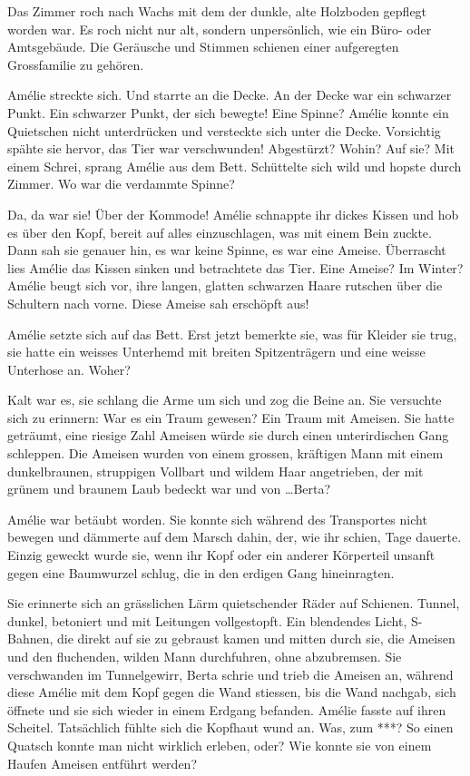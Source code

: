 \documentclass[11pt,titlepage,a5paper]{book}
\begin{document}
Das Zimmer roch nach Wachs mit dem der dunkle, alte Holzboden gepflegt worden war. Es roch nicht nur alt, sondern unpersönlich, wie ein Büro- oder Amtsgebäude. Die Geräusche und Stimmen schienen einer aufgeregten Grossfamilie zu gehören.

Amélie streckte sich. Und starrte an die Decke. An der Decke war ein schwarzer Punkt. Ein schwarzer Punkt, der sich bewegte! Eine Spinne? Amélie konnte ein Quietschen nicht unterdrücken und versteckte sich unter die Decke. Vorsichtig spähte sie hervor, das Tier war verschwunden! Abgestürzt? Wohin? Auf sie? Mit einem Schrei, sprang Amélie aus dem Bett. Schüttelte sich wild und hopste durch Zimmer. Wo war die verdammte Spinne?

 Da, da war sie! Über der Kommode! Amélie schnappte ihr dickes Kissen und hob es über den Kopf, bereit auf alles einzuschlagen, was mit einem Bein zuckte. Dann sah sie genauer hin, es war keine Spinne, es war eine Ameise. Überrascht lies Amélie das Kissen sinken und betrachtete das Tier. Eine Ameise? Im Winter? Amélie beugt sich vor, ihre langen, glatten schwarzen Haare rutschen über die Schultern nach vorne. Diese Ameise sah erschöpft aus!

Amélie setzte sich auf das Bett. Erst jetzt bemerkte sie, was für Kleider sie trug, sie hatte ein weisses Unterhemd mit breiten Spitzenträgern und eine weisse Unterhose an. Woher? 

Kalt war es, sie schlang die Arme um sich und zog die Beine an. Sie versuchte sich zu erinnern: War es ein Traum gewesen? Ein Traum mit Ameisen. Sie hatte geträumt, eine riesige Zahl Ameisen würde sie durch einen unterirdischen Gang schleppen. Die Ameisen wurden von einem grossen, kräftigen Mann mit einem dunkelbraunen, struppigen Vollbart und wildem Haar angetrieben, der mit grünem und braunem Laub bedeckt war und von \dots Berta?

 Amélie war betäubt worden. Sie konnte sich während des Transportes nicht bewegen und dämmerte auf dem Marsch dahin, der, wie ihr schien, Tage dauerte. Einzig geweckt wurde sie, wenn ihr Kopf oder ein anderer Körperteil unsanft gegen eine Baumwurzel schlug, die  in den erdigen Gang hineinragten. 
 
 Sie erinnerte sich an grässlichen Lärm quietschender Räder auf Schienen. Tunnel, dunkel, betoniert und mit Leitungen vollgestopft. Ein blendendes Licht, S-Bahnen, die direkt auf sie zu gebraust kamen und mitten durch sie, die Ameisen und den fluchenden, wilden Mann durchfuhren, ohne abzubremsen. Sie verschwanden im Tunnelgewirr, Berta schrie und trieb die Ameisen an, während diese Amélie mit dem Kopf gegen die Wand stiessen, bis die Wand nachgab, sich öffnete und sie sich wieder in einem Erdgang befanden. Amélie fasste auf ihren Scheitel. Tatsächlich fühlte sich die Kopfhaut wund an. Was, zum ***? So einen Quatsch konnte man nicht wirklich erleben, oder? Wie konnte sie von einem Haufen Ameisen entführt werden? 
\end{document}
